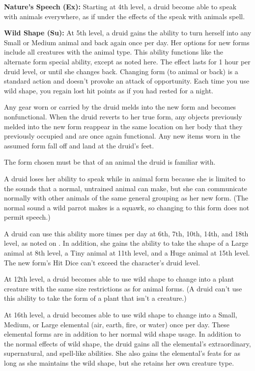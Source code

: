 \textbf{Nature's Speech (Ex):} Starting at 4th level, a druid become able to speak with animals everywhere, as if under the effects of the speak with animals spell.

\textbf{Wild Shape (Su):} At 5th level, a druid gains the ability to turn herself into any Small or Medium animal and back again once per day. Her options for new forms include all creatures with the animal type. This ability functions like the alternate form special ability, except as noted here. The effect lasts for 1 hour per druid level, or until she changes back. Changing form (to animal or back) is a standard action and doesn't provoke an attack of opportunity. Each time you use wild shape, you regain lost hit points as if you had rested for a night.

Any gear worn or carried by the druid melds into the new form and becomes nonfunctional. When the druid reverts to her true form, any objects previously melded into the new form reappear in the same location on her body that they previously occupied and are once again functional. Any new items worn in the assumed form fall off and land at the druid's feet.

The form chosen must be that of an animal the druid is familiar with.

A druid loses her ability to speak while in animal form because she is limited to the sounds that a normal, untrained animal can make, but she can communicate normally with other animals of the same general grouping as her new form. (The normal sound a wild parrot makes is a squawk, so changing to this form does not permit speech.)

A druid can use this ability more times per day at 6th, 7th, 10th, 14th, and 18th level, as noted on . In addition, she gains the ability to take the shape of a Large animal at 8th level, a Tiny animal at 11th level, and a Huge animal at 15th level. The new form's Hit Dice can't exceed the character's druid level.

At 12th level, a druid becomes able to use wild shape to change into a plant creature with the same size restrictions as for animal forms. (A druid can't use this ability to take the form of a plant that isn't a creature.)

At 16th level, a druid becomes able to use wild shape to change into a Small, Medium, or Large elemental (air, earth, fire, or water) once per day. These elemental forms are in addition to her normal wild shape usage. In addition to the normal effects of wild shape, the druid gains all the elemental's extraordinary, supernatural, and spell-like abilities. She also gains the elemental's feats for as long as she maintains the wild shape, but she retains her own creature type.

